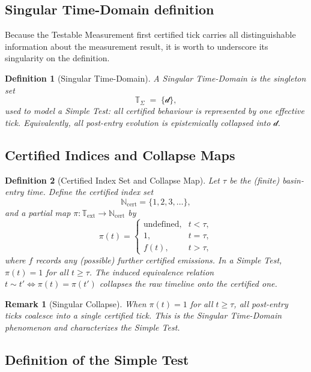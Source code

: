 \documentclass[12pt]{article}
\newtheorem{definition}{Definition}[section]
\newtheorem{remark}{Remark}[section]
\begin{document}
\subsection{Singular Time-Domain definition}

Because the Testable Measurement first certified tick carries all distinguishable information about the measurement result, it is worth to underscore its singularity on the definition.

\begin{definition}[Singular Time-Domain]
A \emph{Singular Time-Domain} is the singleton set
\[
  \mathbb T_{\Sigma} \;=\; \{\mathcal d\},
\]
used to model a \emph{Simple Test}: all certified behaviour is represented by one effective tick.  Equivalently, all post-entry evolution is epistemically collapsed into \(\mathcal d\).
\end{definition}

\subsection*{Certified Indices and Collapse Maps}

\begin{definition}[Certified Index Set and Collapse Map]
Let \(\tau\) be the (finite) basin-entry time.  Define the \emph{certified index set}
\[
  \mathbb N_{\mathrm{cert}}=\{1,2,3,\dots\},
\]
and a partial map \(\pi:\mathbb T_{\mathrm{ext}}\to\mathbb N_{\mathrm{cert}}\) by
\[
  \pi(t)=
  \begin{cases}
    \text{undefined}, & t<\tau,\\[2pt]
    1, & t=\tau,\\[2pt]
    f(t), & t>\tau,
  \end{cases}
\]
where \(f\) records any (possible) further certified emissions.  In a Simple Test,
\(\pi(t)=1\) for all \(t\ge\tau\).  The induced equivalence relation
\(t\sim t'\iff \pi(t)=\pi(t')\) collapses the raw timeline onto the certified one.
\end{definition}

\begin{remark}[Singular Collapse]
When \(\pi(t)=1\) for all \(t\ge\tau\), all post-entry ticks coalesce into a single certified tick.  This is the \emph{Singular Time-Domain} phenomenon and characterizes the Simple Test.
\end{remark}

% 

\subsection*{Definition of the Simple Test}
\end{document}
